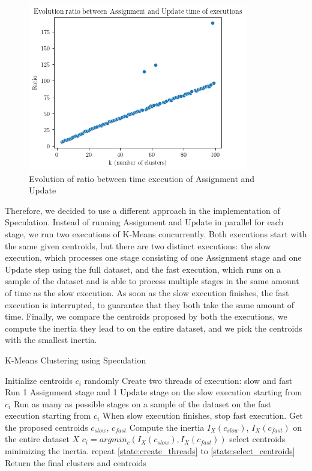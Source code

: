 \begin{figure}[ht]
\centering
\includegraphics[width=\linewidth]{./plots/ratio_k.png}
\caption{Evolution of ratio between time execution of Assignment and Update}
\label{fig:ratio_k}
\end{figure}

Therefore, we decided to use a different approach in the implementation of Speculation. Instead of running Assignment and Update in parallel for each stage, we run two executions of K-Means concurrently. Both executions start with the same given centroids, but there are two distinct executions: the slow execution, which processes one stage consisting of one Assignment stage and one Update step using the full dataset, and the fast execution, which runs on a sample of the dataset and is able to process multiple stages in the same amount of time as the slow execution. As soon as the slow execution finishes, the fast execution is interrupted, to guarantee that they both take the same amount of time.
Finally, we compare the centroids proposed by both the executions, we compute the inertia they lead to on the entire dataset, and we pick the centroids with the smallest inertia.
\begin{algorithm}
\caption{K-Means Clustering using Speculation}
\label{alg:kmeans_speculation}
\begin{algorithmic}[1]
\State Initialize centroids $c_i$ randomly
\State Create two threads of execution: slow and fast
\label{state:create_threads}
\State Run 1 Assignment stage and 1 Update stage on the slow execution starting from $c_i$
\State Run as many as possible stages on a sample of the dataset on the fast execution starting from $c_i$
\State When slow execution finishes, stop fast execution. Get the proposed centroids $c_{slow}$, $c_{fast}$
\State Compute the inertia $I_X(c_{slow})$, $I_X(c_{fast})$ on the entire dataset $X$
\State $c_i = argmin_c(I_X(c_{slow}), I_X(c_{fast}))$ select centroids minimizing the inertia.
\label{state:select_centroids}
    \State repeat \ref{state:create_threads} to \ref{state:select_centroids}
\EndWhile
\State Return the final clusters and centroids
\end{algorithmic}
\end{algorithm}

